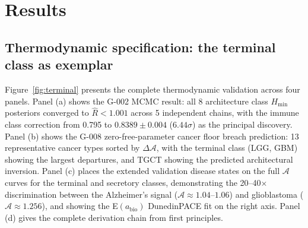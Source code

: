 \documentclass[12pt,a4paper]{article}
\newcommand{\Hmin}{H_{\min}}
\newcommand{\Ascore}{\mathcal{A}}
\begin{document}
\section{Results}
\label{sec:results}

\subsection{Thermodynamic specification: the terminal class as exemplar}
\label{sec:terminal_spec}

Figure~\ref{fig:terminal} presents the complete thermodynamic validation across
four panels. Panel (a) shows the G-002 MCMC result: all 8 architecture class
$\Hmin$ posteriors converged to $\hat{R}<1.001$ across 5 independent chains,
with the immune class correction from 0.795 to $0.8389\pm0.004$ ($6.44\sigma$)
as the principal discovery. Panel (b) shows the G-008 zero-free-parameter cancer
floor breach prediction: 13 representative cancer types sorted by $\Delta\Ascore$,
with the terminal class (LGG, GBM) showing the largest departures, and TGCT
showing the predicted architectural inversion. Panel (c) places the extended
validation disease states on the full $\Ascore$ curves for the terminal and
secretory classes, demonstrating the 20--40$\times$ discrimination between the
Alzheimer's signal ($\Ascore\approx1.04$--$1.06$) and glioblastoma
($\Ascore\approx1.256$), and showing the E$(a_{\mathrm{bio}})$ DunedinPACE fit on
the right axis. Panel (d) gives the complete derivation chain from first principles.
\end{document}
